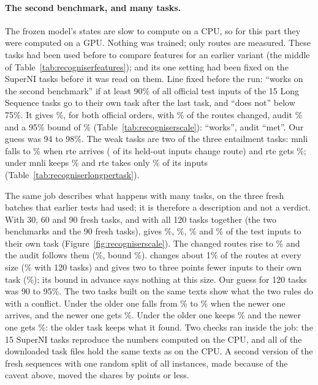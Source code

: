 \paragraph{The second benchmark, and many tasks.} The frozen model's states are slow to compute on a CPU, so for this part they were computed on a GPU. Nothing was trained; only routes are measured.
These tasks had been used before to compare features for an earlier variant (the middle of Table~\ref{tab:recogniserfeatures}); \recog{} and its one setting had been fixed on the SuperNI tasks before it was read on them.
Line fixed before the run: \recog{} ``works on the second benchmark'' if at least 90\% of all official test inputs of the 15 Long Sequence tasks go to their own task after the last task, and ``does not'' below 75\%.
It gives \AudScaleLongThreeEnd{}\%, for both official orders, with \AudScaleLongThreeChanged{}\% of the routes changed, audit \AudScaleLongThreeAuditEst{}\% and a 95\% bound of \AudScaleLongThreeAuditBound{}\% (Table~\ref{tab:recogniserscale}): ``works'', audit ``met''.
Our guess was 94 to 98\%.
The weak tasks are two of the three entailment tasks: mnli falls to \AudScaleLongMnliEnd{}\% when rte arrives (\AudScaleLongMnliC{} of its \AudScaleLongMnliM{} held-out inputs change route) and rte gets \AudScaleLongRteEnd{}\%; under \handicap{} mnli keeps \AudScaleLongMnliHEnd{}\% and rte takes only \AudScaleLongRteHEnd{}\% of its inputs (Table~\ref{tab:recogniserlongpertask}).

The same job describes what happens with many tasks, on the three fresh batches that earlier tests had used; it is therefore a description and not a verdict.
With 30, 60 and 90 fresh tasks, and with all 120 tasks together (the two benchmarks and the 90 fresh tasks), \recog{} gives \AudScaleFreshThirtyEnd{}\%, \AudScaleFreshSixtyEnd{}\%, \AudScaleFreshNinetyEnd{}\% and \AudScaleAllHundredTwentyEnd{}\% of the test inputs to their own task (Figure~\ref{fig:recogniserscale}).
The changed routes rise to \AudScaleAllHundredTwentyChanged{}\% and the audit follows them (\AudScaleAllHundredTwentyAuditEst{}\%, bound \AudScaleAllHundredTwentyAuditBound{}\%).
\handicap{} changes about 1\% of the routes at every size (\AudScaleAllHundredTwentyHChanged{}\% with 120 tasks) and gives two to three points fewer inputs to their own task (\AudScaleAllHundredTwentyHEnd{}\%); its bound in advance says nothing at this size.
Our guess for 120 tasks was 90 to 95\%.
The two tasks built on the same texts show what the two rules do with a conflict. Under \recog{} the older one falls from \AudScalePairOlderLArrival{}\% to \AudScalePairOlderLEnd{}\% when the newer one arrives, and the newer one gets \AudScalePairNewerLEnd{}\%. Under \handicap{} the older one keeps \AudScalePairOlderHEnd{}\% and the newer one gets \AudScalePairNewerHEnd{}\%: the older task keeps what it found.
Two checks ran inside the job: the 15 SuperNI tasks reproduce the numbers computed on the CPU, and all \AudScaleFingerprintMatch{} of the \AudScaleFingerprintTotal{} downloaded task files hold the same texts as on the CPU.
A second version of the fresh sequences with one random split of all instances, made because of the caveat above, moved the shares by \AudScaleSplitMaxDiffEnd{} points or less.

